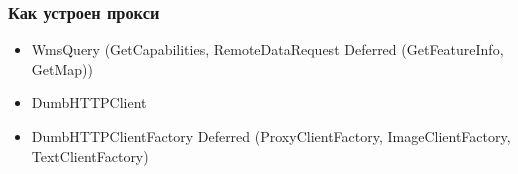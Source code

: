 \begin{frame}
  \frametitle{Как устроен прокси}

  \begin{itemize}
  \item WmsQuery (GetCapabilities, RemoteDataRequest {\scriptsize Deferred} (GetFeatureInfo, GetMap))
  \item DumbHTTPClient
  \item DumbHTTPClientFactory {\scriptsize Deferred} (ProxyClientFactory, ImageClientFactory, TextClientFactory)
  \end{itemize}
\end{frame}
